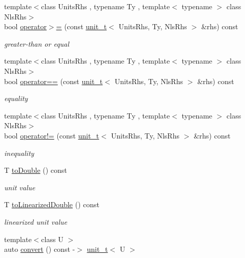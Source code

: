 \begin{DoxyCompactItemize}
{\footnotesize template$<$class Units\+Rhs , typename Ty , template$<$ typename $>$ class Nls\+Rhs$>$ }\\bool \hyperlink{classunits_1_1unit__t_ae3a3d9bc32509317487fa1852520420a}{operator$>$=} (const \hyperlink{classunits_1_1unit__t}{unit\+\_\+t}$<$ Units\+Rhs, Ty, Nls\+Rhs $>$ \&rhs) const 
\begin{DoxyCompactList}\small\item\em greater-\/than or equal \end{DoxyCompactList}\item 
{\footnotesize template$<$class Units\+Rhs , typename Ty , template$<$ typename $>$ class Nls\+Rhs$>$ }\\bool \hyperlink{classunits_1_1unit__t_aaa6589b34df6163f45055c9df2214629}{operator==} (const \hyperlink{classunits_1_1unit__t}{unit\+\_\+t}$<$ Units\+Rhs, Ty, Nls\+Rhs $>$ \&rhs) const 
\begin{DoxyCompactList}\small\item\em equality \end{DoxyCompactList}\item 
{\footnotesize template$<$class Units\+Rhs , typename Ty , template$<$ typename $>$ class Nls\+Rhs$>$ }\\bool \hyperlink{classunits_1_1unit__t_ab9b140f6141ea78e5304b088d6bb81b5}{operator!=} (const \hyperlink{classunits_1_1unit__t}{unit\+\_\+t}$<$ Units\+Rhs, Ty, Nls\+Rhs $>$ \&rhs) const 
\begin{DoxyCompactList}\small\item\em inequality \end{DoxyCompactList}\item 
T \hyperlink{classunits_1_1unit__t_abfc0a8abeee60499832e10f24ab5654b}{to\+Double} () const 
\begin{DoxyCompactList}\small\item\em unit value \end{DoxyCompactList}\item 
T \hyperlink{classunits_1_1unit__t_a331e19510321235c844ecb880fea6afd}{to\+Linearized\+Double} () const 
\begin{DoxyCompactList}\small\item\em linearized unit value \end{DoxyCompactList}\item 
{\footnotesize template$<$class U $>$ }\\auto \hyperlink{classunits_1_1unit__t_aea6e94679c69dafc348fd043c4d65d23}{convert} () const -\/$>$ \hyperlink{classunits_1_1unit__t}{unit\+\_\+t}$<$ U $>$

\end{DoxyCompactItemize}
